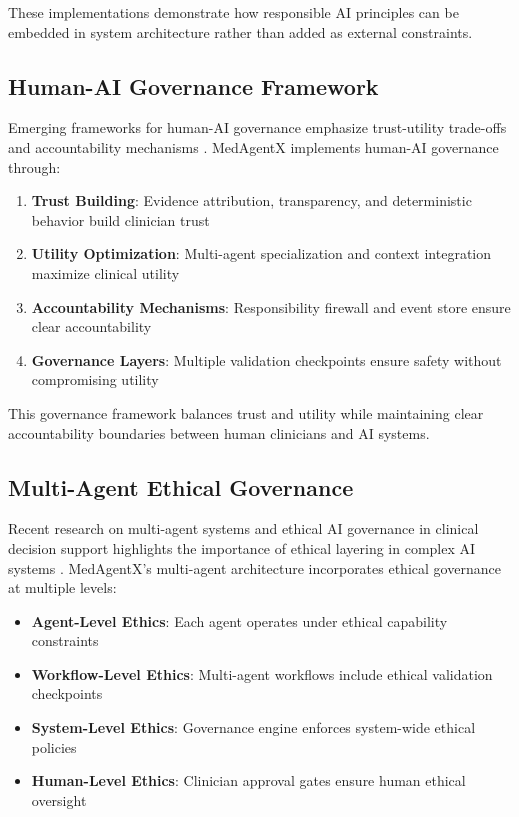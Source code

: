 \documentclass[journal]{IEEEtran}
\begin{document}
These implementations demonstrate how responsible AI principles can be embedded in system architecture rather than added as external constraints.

\subsection{Human-AI Governance Framework}
Emerging frameworks for human-AI governance emphasize trust-utility trade-offs and accountability mechanisms \cite{human_ai_governance_2025}. MedAgentX implements human-AI governance through:

\begin{enumerate}
    \item \textbf{Trust Building}: Evidence attribution, transparency, and deterministic behavior build clinician trust
    \item \textbf{Utility Optimization}: Multi-agent specialization and context integration maximize clinical utility
    \item \textbf{Accountability Mechanisms}: Responsibility firewall and event store ensure clear accountability
    \item \textbf{Governance Layers}: Multiple validation checkpoints ensure safety without compromising utility
\end{enumerate}

This governance framework balances trust and utility while maintaining clear accountability boundaries between human clinicians and AI systems.

\subsection{Multi-Agent Ethical Governance}
Recent research on multi-agent systems and ethical AI governance in clinical decision support highlights the importance of ethical layering in complex AI systems \cite{multi_agent_ethical_governance_2025}. MedAgentX's multi-agent architecture incorporates ethical governance at multiple levels:

\begin{itemize}
    \item \textbf{Agent-Level Ethics}: Each agent operates under ethical capability constraints
    \item \textbf{Workflow-Level Ethics}: Multi-agent workflows include ethical validation checkpoints
    \item \textbf{System-Level Ethics}: Governance engine enforces system-wide ethical policies
    \item \textbf{Human-Level Ethics}: Clinician approval gates ensure human ethical oversight
\end{itemize}
\end{document}
